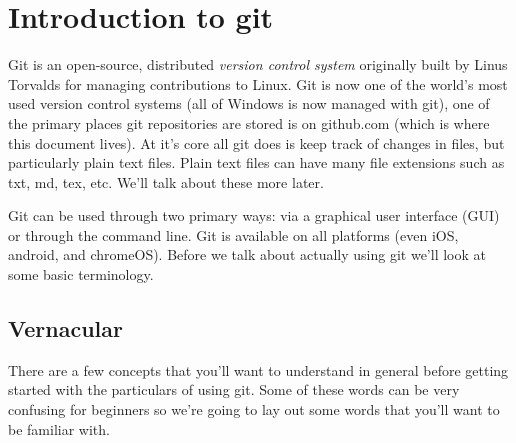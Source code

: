 \section{Introduction to git}

Git is an open-source, distributed \textit{version control system} originally built by Linus Torvalds for managing contributions to Linux. Git is now one of the world's most used version control systems (all of Windows is now managed with git), one of the primary places git repositories are stored is on github.com (which is where this document lives). At it's core all git does is keep track of changes in files, but particularly plain text files. Plain text files can have many file extensions such as txt, md, tex, etc. We'll talk about these more later.

Git can be used through two primary ways: via a graphical user interface (GUI) or through the command line. Git is available on all platforms (even iOS, android, and chromeOS). Before we talk about actually using git we'll look at some basic terminology.


\subsection{Vernacular}

There are a few concepts that you'll want to understand in general before getting started with the particulars of using git. Some of these words can be very confusing for beginners so we're going to lay out some words that you'll want to be familiar with.

